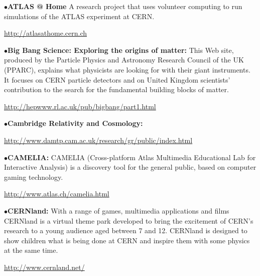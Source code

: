 \medskip



\item{$\bullet$}{\bf ATLAS @ Home}
A research project that uses volunteer computing to run simulations of the ATLAS experiment at CERN.
	\item{}\qquad\url{http://atlasathome.cern.ch}

\medskip

\item{$\bullet$}{\bf Big Bang Science: Exploring the origins of matter:} 
This Web site, produced by the Particle Physics and Astronomy Research Council of the UK (PPARC), explains what physicists are looking for with their giant instruments. It focuses on CERN particle detectors and on United Kingdom scientists' contribution to the search for the fundamental building blocks of matter.
	\item{}\qquad\url{http://hepwww.rl.ac.uk/pub/bigbang/part1.html}

\medskip

\item{$\bullet$}{\bf Cambridge Relativity and Cosmology:} 
	\item{}\qquad\url{http://www.damtp.cam.ac.uk/research/gr/public/index.html}

\medskip

\item{$\bullet$}{\bf CAMELIA:} 
CAMELIA (Cross-platform Atlas Multimedia Educational Lab for Interactive Analysis) is a discovery tool for the general public, based on computer gaming technology.
	\item{}\qquad\url{http://www.atlas.ch/camelia.html}

\medskip

\item{$\bullet$}{\bf CERNland:}
With a range of games, multimedia applications and films CERNland is a virtual theme park developed to bring the excitement of CERN's research to a young audience aged between 7 and 12. CERNland is designed to show children what is being done at CERN and inspire them with some physics at the same time.
	\item{}\qquad\url{http://www.cernland.net/}

